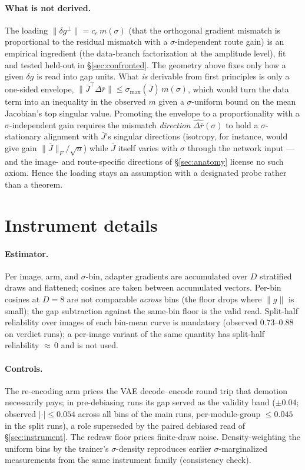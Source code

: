 \paragraph{What is not derived.} The loading
$\|\delta g^{\perp}\| = c_e\, m(\sigma)$ (that the orthogonal
gradient mismatch is proportional to the residual mismatch with a
$\sigma$-independent route gain) is an empirical ingredient
(the data-branch factorization at the amplitude level), fit and tested
held-out in
\S\ref{sec:confronted}. The geometry above fixes only how a given
$\delta g$ is read into gap units. What \emph{is} derivable from first
principles is only a one-sided envelope,
$\|\bar J^{\!\top}\Delta\bar r\| \le \sigma_{\max}(\bar J)\,
m(\sigma)$, which would turn the data term into an inequality in the
observed $m$ given a $\sigma$-uniform bound on the mean Jacobian's top
singular value. Promoting the envelope to a proportionality with a
$\sigma$-independent gain requires the mismatch \emph{direction}
$\widehat{\Delta\bar r}(\sigma)$ to hold a $\sigma$-stationary
alignment with $\bar J$'s singular directions (isotropy, for instance,
would give gain $\|\bar J\|_F/\sqrt{n}$) while $\bar J$ itself varies
with $\sigma$ through the network input --- and the image- and
route-specific directions of \S\ref{sec:anatomy} license no such
axiom. Hence the loading stays an assumption with a designated probe
rather than a theorem.

\section{Instrument details}
\label{app:instrument}

\paragraph{Estimator.} Per image, arm, and $\sigma$-bin, adapter gradients
are accumulated over $D$ stratified draws and flattened; cosines are taken
between accumulated vectors. Per-bin cosines at $D{=}8$ are not comparable
\emph{across} bins (the floor drops where $\|g\|$ is small); the gap
subtraction against the same-bin floor is the valid read. Split-half
reliability over images of each bin-mean curve is mandatory
(observed $0.73$--$0.88$ on verdict runs); a per-image variant of the same
quantity has split-half reliability ${\approx}\,0$ and is not used.

\paragraph{Controls.} The re-encoding arm prices the VAE decode--encode
round trip that demotion necessarily pays; in pre-debiasing runs its gap
served as the validity band ($\pm 0.04$; observed $|\cdot| \le 0.054$
across all bins of the main runs, per-module-group $\le 0.045$ in the
split runs), a role superseded by the paired debiased read of
\S\ref{sec:instrument}. The redraw floor prices finite-draw noise.
Density-weighting the uniform bins by the trainer's $\sigma$-density
reproduces earlier $\sigma$-marginalized measurements from the same
instrument family (consistency check).

